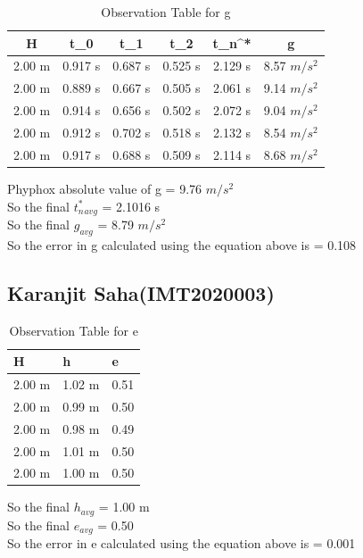 \documentclass[11pt]{scrartcl} %
\begin{document}
\begin{table}[h]
\centering
\begin{tabular}{||c c c c c c||} 
\toprule
 \hline
 H & t_0 & t_1 & t_2 & t_n^* & g \\ [0.5ex] 
 \midrule
 \hline\hline
 2.00 m & 0.917 s & 0.687 s  & 0.525 s & 2.129 s & 8.57 $m/s^2$  \\ 
 \hline
 2.00 m & 0.889 s & 0.667 s & 0.505 s & 2.061 s & 9.14 $m/s^2$  \\
 \hline 
 2.00 m & 0.914 s & 0.656 s & 0.502 s & 2.072 s  & 9.04 $m/s^2$   \\
 \hline
 2.00 m & 0.912 s & 0.702 s & 0.518 s & 2.132 s  & 8.54 $m/s^2$   \\
 \hline
 2.00 m & 0.917 s & 0.688 s & 0.509 s & 2.114 s  & 8.68 $m/s^2$  \\ 
 [1ex]
 \bottomrule
 \hline
\end{tabular}
\caption{Observation Table for g}
\end{table}
Phyphox absolute value of g = 9.76 $m/s^2$\\
So the final $t_n^*_{avg}$ = 2.1016 s\\
So the final $g_{avg}$ = 8.79 $m/s^2$\\
So the error in g calculated using the equation above is  = 0.108  \\

\newpage
\subsection{Karanjit Saha(IMT2020003)}

\begin{table}[h] %
	\centering %
	\begin{tabular}{l l l}
		\toprule
		\textbf{H} & \textbf{h} & \textbf{e} \\
		\midrule
		2.00 m & 1.02 m & 0.51\\
		2.00 m & 0.99 m  & 0.50\\
		2.00 m & 0.98 m  & 0.49\\
		2.00 m & 1.01 m & 0.50 \\
		2.00 m & 1.00 m & 0.50 \\
		\bottomrule
	\end{tabular}
	\caption{Observation Table for e}
\end{table}
So the final $h_{avg}$ = 1.00 m\\
So the final $e_{avg}$ = 0.50\\
So the error in e calculated using the equation above is  = 0.001 
\end{document}

